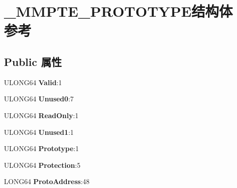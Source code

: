 \hypertarget{struct___m_m_p_t_e___p_r_o_t_o_t_y_p_e}{}\section{\+\_\+\+M\+M\+P\+T\+E\+\_\+\+P\+R\+O\+T\+O\+T\+Y\+P\+E结构体 参考}
\label{struct___m_m_p_t_e___p_r_o_t_o_t_y_p_e}
\subsection*{Public 属性}
\begin{DoxyCompactItemize}
\item 
\mbox{\label{struct___m_m_p_t_e___p_r_o_t_o_t_y_p_e_a0a5c7ba4cf319cabdee7f2a4dd9d91f4}} 
U\+L\+O\+N\+G64 {\bfseries Valid}\+:1
\item 
\mbox{\label{struct___m_m_p_t_e___p_r_o_t_o_t_y_p_e_a97c8cda240eff8b62d0c07c82651c7eb}} 
U\+L\+O\+N\+G64 {\bfseries Unused0}\+:7
\item 
\mbox{\label{struct___m_m_p_t_e___p_r_o_t_o_t_y_p_e_a4d168cbdfd14068234b5effc174b90c2}} 
U\+L\+O\+N\+G64 {\bfseries Read\+Only}\+:1
\item 
\mbox{\label{struct___m_m_p_t_e___p_r_o_t_o_t_y_p_e_a3ad872c2bab703ed78590acd713ccc56}} 
U\+L\+O\+N\+G64 {\bfseries Unused1}\+:1
\item 
\mbox{\label{struct___m_m_p_t_e___p_r_o_t_o_t_y_p_e_a637ac956482e374e73a21fa24ccf8e03}} 
U\+L\+O\+N\+G64 {\bfseries Prototype}\+:1
\item 
\mbox{\label{struct___m_m_p_t_e___p_r_o_t_o_t_y_p_e_a63186e339611c7cb2b98250852a7cae4}} 
U\+L\+O\+N\+G64 {\bfseries Protection}\+:5
\item 
\mbox{\label{struct___m_m_p_t_e___p_r_o_t_o_t_y_p_e_ac6cfe2b319e0080c2821b10d109db3b7}} 
L\+O\+N\+G64 {\bfseries Proto\+Address}\+:48
\item 
\mbox{\label{struct___m_m_p_t_e___p_r_o_t_o_t_y_p_e_a0a5c7ba4cf319cabdee7f2a4dd9d91f4}} 

\end{DoxyCompactItemize}
